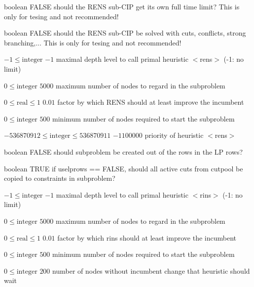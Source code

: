 %
{boolean}%
{FALSE}%
{should the RENS sub-CIP get its own full time limit? This is only for tesing and not recommended!}%
{}

%
{boolean}%
{FALSE}%
{should the RENS sub-CIP be solved with cuts, conflicts, strong branching,... This is only for tesing and not recommended!}%
{}

%
{$-1\leq\textrm{integer}$}%
{$-1$}%
{maximal depth level to call primal heuristic $<$rens$>$ (-1: no limit)}%
{}

%
{$0\leq\textrm{integer}$}%
{$5000$}%
{maximum number of nodes to regard in the subproblem}%
{}

%
{$0\leq\textrm{real}\leq1$}%
{$0.01$}%
{factor by which RENS should at least improve the incumbent}%
{}

%
{$0\leq\textrm{integer}$}%
{$500$}%
{minimum number of nodes required to start the subproblem}%
{}

%
{$-536870912\leq\textrm{integer}\leq536870911$}%
{$-1100000$}%
{priority of heuristic $<$rens$>$}%
{}

%
{boolean}%
{FALSE}%
{should subproblem be created out of the rows in the LP rows?}%
{}

%
{boolean}%
{TRUE}%
{if uselprows == FALSE, should all active cuts from cutpool be copied to constraints in subproblem?}%
{}

%
{$-1\leq\textrm{integer}$}%
{$-1$}%
{maximal depth level to call primal heuristic $<$rins$>$ (-1: no limit)}%
{}

%
{$0\leq\textrm{integer}$}%
{$5000$}%
{maximum number of nodes to regard in the subproblem}%
{}

%
{$0\leq\textrm{real}\leq1$}%
{$0.01$}%
{factor by which rins should at least improve the incumbent}%
{}

%
{$0\leq\textrm{integer}$}%
{$500$}%
{minimum number of nodes required to start the subproblem}%
{}

%
{$0\leq\textrm{integer}$}%
{$200$}%
{number of nodes without incumbent change that heuristic should wait}%
{}


